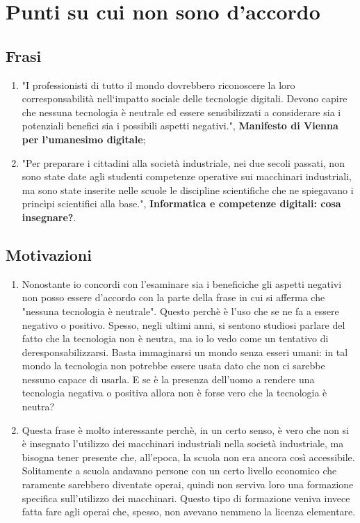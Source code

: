 \section{Punti su cui non sono d'accordo}
\subsection{Frasi}
\begin{enumerate}
    \item "I professionisti di tutto il mondo dovrebbero riconoscere la loro corresponsabilità
    nell‘impatto sociale delle tecnologie digitali. Devono capire che nessuna tecnologia è
    neutrale ed essere sensibilizzati a considerare sia i potenziali benefici sia i possibili aspetti
    negativi.", \textbf{Manifesto di Vienna per l'umanesimo digitale};
    \item "Per preparare i cittadini alla società industriale, nei due secoli passati, non sono state date agli studenti competenze operative sui macchinari industriali, ma sono state inserite nelle scuole le discipline scientifiche che ne spiegavano i princìpi scientifici alla base.", \textbf{Informatica e competenze digitali: cosa insegnare?}. 
\end{enumerate}

\subsection{Motivazioni}
\begin{enumerate}
    \item Nonostante io concordi con l'esaminare sia i beneficiche gli aspetti negativi non posso
    essere d'accordo con la parte della frase in cui si afferma che "nessuna tecnologia è neutrale".
    Questo perchè è l'uso che se ne fa a essere negativo o positivo. Spesso, negli ultimi anni, si sentono
    studiosi parlare del fatto che la tecnologia non è neutra, ma io lo vedo come un tentativo di deresponsabilizzarsi.
    Basta immaginarsi un mondo senza esseri umani: in tal mondo la tecnologia non potrebbe essere usata dato che non ci
    sarebbe nessuno capace di usarla. E se è la presenza dell'uomo a rendere una tecnologia negativa o positiva allora 
    non è forse vero che la tecnologia è neutra?
    \item Questa frase è molto interessante perchè, in un certo senso, è vero che non si è insegnato l'utilizzo dei macchinari 
    industriali nella società industriale, ma bisogna tener presente che, all'epoca, la scuola non era ancora così accessibile.
    Solitamente a scuola andavano persone con un certo livello economico che raramente sarebbero diventate operai, quindi non 
    serviva loro una formazione specifica sull'utilizzo dei macchinari. Questo tipo di formazione veniva invece fatta fare agli
    operai che, spesso, non avevano nemmeno la licenza elementare.
\end{enumerate}

